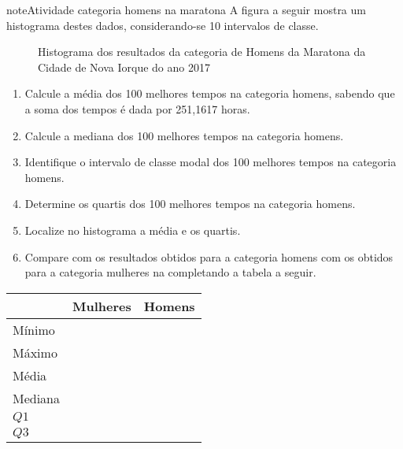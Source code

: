 \begin{sphinxadmonition}{note}{Atividade}{ categoria homens na maratona}
A figura a seguir mostra um histograma destes dados, considerando-se 10 intervalos de classe.

\begin{figure}[H]
\centering
\capstart

\noindent{}
\caption{Histograma dos resultados da categoria de Homens da Maratona da Cidade de Nova Iorque do ano 2017}\label{\detokenize{PE104-2:fig-histograma-maratona-homens}}\label{\detokenize{PE104-2:id3}}\end{figure}
\begin{enumerate}
\item {} 
Calcule a média dos 100 melhores tempos na categoria homens, sabendo que a soma dos tempos é dada por 251,1617 horas.

\item {} 
Calcule a mediana dos 100 melhores tempos na categoria homens.

\item {} 
Identifique o intervalo de classe modal dos 100 melhores tempos na categoria homens.

\item {} 
Determine os quartis dos 100 melhores tempos na categoria homens.

\item {} 
Localize no histograma a média e os quartis.

\item {} 
Compare com os resultados obtidos para a categoria homens com os obtidos para a categoria mulheres na  completando a tabela a seguir.

\end{enumerate}


\begin{savenotes}\sphinxattablestart
\centering
{}
\label{\detokenize{PE104-2:id4}}
\sphinxaftercaption
\begin{tabulary}{\linewidth}[t]{|T|T|T|}
\hline
&
Mulheres
&
Homens
\\
\hline
Mínimo
&&\\
\hline
Máximo
&&\\
\hline
Média
&&\\
\hline
Mediana
&&\\
\hline
\(Q1\)
&&\\
\hline
\(Q3\)
&&\\
\hline
\end{tabulary}
\par
\sphinxattableend\end{savenotes}
\end{sphinxadmonition}

